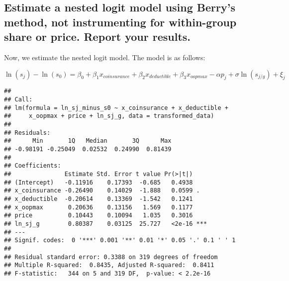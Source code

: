 \documentclass[]{article}
\newenvironment{Shaded}{\begin{snugshade}}{\end{snugshade}}
\newcommand{\DataTypeTok}[1]{\textcolor[rgb]{0.13,0.29,0.53}{#1}}
\newcommand{\DecValTok}[1]{\textcolor[rgb]{0.00,0.00,0.81}{#1}}
\newcommand{\KeywordTok}[1]{\textcolor[rgb]{0.13,0.29,0.53}{\textbf{#1}}}
\newcommand{\NormalTok}[1]{#1}
\newcommand{\OperatorTok}[1]{\textcolor[rgb]{0.81,0.36,0.00}{\textbf{#1}}}
\newcommand{\StringTok}[1]{\textcolor[rgb]{0.31,0.60,0.02}{#1}}
\begin{document}
\hypertarget{estimate-a-nested-logit-model-using-berrys-method-not-instrumenting-for-within-group-share-or-price.-report-your-results.}{%
\subsection{Estimate a nested logit model using Berry's method, not
instrumenting for within-group share or price. Report your
results.}\label{estimate-a-nested-logit-model-using-berrys-method-not-instrumenting-for-within-group-share-or-price.-report-your-results.}}

Now, we estimate the nested logit model. The model is as follows:

\[
\ln(s_j) - \ln(s_0) = \beta_0 + \beta_1 x_{coinsurance} + \beta_2 x_{deductible} + \beta_3 x_{oopmax} - \alpha p_j + \sigma \ln(s_{j/g}) + \xi_j
\]

\begin{Shaded}
\end{Shaded}

\begin{verbatim}
## 
## Call:
## lm(formula = ln_sj_minus_s0 ~ x_coinsurance + x_deductible + 
##     x_oopmax + price + ln_sj_g, data = transformed_data)
## 
## Residuals:
##      Min       1Q   Median       3Q      Max 
## -0.98191 -0.25049  0.02532  0.24990  0.81439 
## 
## Coefficients:
##               Estimate Std. Error t value Pr(>|t|)    
## (Intercept)   -0.11916    0.17393  -0.685   0.4938    
## x_coinsurance -0.26490    0.14029  -1.888   0.0599 .  
## x_deductible  -0.20614    0.13369  -1.542   0.1241    
## x_oopmax       0.20636    0.13156   1.569   0.1177    
## price          0.10443    0.10094   1.035   0.3016    
## ln_sj_g        0.80387    0.03125  25.727   <2e-16 ***
## ---
## Signif. codes:  0 '***' 0.001 '**' 0.01 '*' 0.05 '.' 0.1 ' ' 1
## 
## Residual standard error: 0.3388 on 319 degrees of freedom
## Multiple R-squared:  0.8435, Adjusted R-squared:  0.8411 
## F-statistic:   344 on 5 and 319 DF,  p-value: < 2.2e-16
\end{verbatim}
\end{document}
